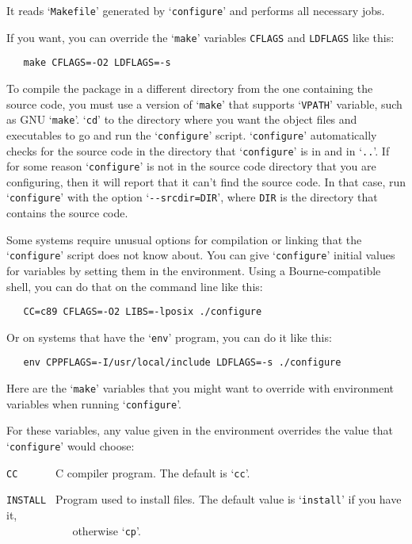 \noindent
It reads `\verb|Makefile|' generated by `\verb|configure|' and performs
all necessary jobs.

If you want, you can override the `\verb|make|' variables \verb|CFLAGS|
and \verb|LDFLAGS| like this:

\begin{verbatim}
   make CFLAGS=-O2 LDFLAGS=-s
\end{verbatim}

To compile the package in a different directory from the one containing
the source code, you must use a version of `\verb|make|' that supports
`\verb|VPATH|' variable, such as GNU `\verb|make|'. `\verb|cd|' to the
directory where you want the object files and executables to go and run
the `\verb|configure|' script. `\verb|configure|' automatically checks
for the source code in the directory that `\verb|configure|' is in and
in `\verb|..|'. If for some reason `\verb|configure|' is not in the
source code directory that you are configuring, then it will report
that it can't find the source code. In that case, run `\verb|configure|'
with the option `\verb|--srcdir=DIR|', where \verb|DIR| is the
directory that contains the source code.

Some systems require unusual options for compilation or linking that
the `\verb|configure|' script does not know about. You can give
`\verb|configure|' initial values for variables by setting them in the
environment. Using a Bourne-compatible shell, you can do that on the
command line like this:

\begin{verbatim}
   CC=c89 CFLAGS=-O2 LIBS=-lposix ./configure
\end{verbatim}

\noindent
Or on systems that have the `\verb|env|' program, you can do it like
this:

\begin{verbatim}
   env CPPFLAGS=-I/usr/local/include LDFLAGS=-s ./configure
\end{verbatim}

Here are the `\verb|make|' variables that you might want to override
with environment variables when running `\verb|configure|'.

For these variables, any value given in the environment overrides the
value that `\verb|configure|' would choose:

\verb|CC      | C compiler program. The default is `\verb|cc|'.

\verb|INSTALL | Program used to install files. The default value is
`\verb|install|' if you have it,\\
\verb|           | otherwise `\verb|cp|'.

